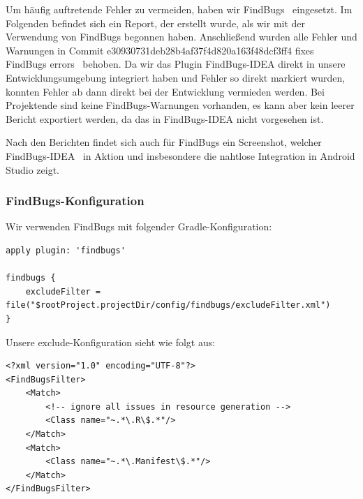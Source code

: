 
Um häufig auftretende Fehler zu vermeiden, haben wir \glqq FindBugs\grqq~ eingesetzt. Im Folgenden befindet sich ein Report, der erstellt wurde, als wir mit der Verwendung von FindBugs begonnen haben. Anschließend wurden alle Fehler und Warnungen in Commit e30930731deb28b4af37f4d820a163f48dcf3ff4 \glqq fixes FindBugs errors\grqq~ behoben. Da wir das Plugin FindBugs-IDEA direkt in unsere Entwicklungsumgebung integriert haben und Fehler so direkt markiert wurden, konnten Fehler ab dann direkt bei der Entwicklung vermieden werden. Bei Projektende sind keine FindBugs-Warnungen vorhanden, es kann aber kein leerer Bericht exportiert werden, da das in FindBugs-IDEA nicht vorgesehen ist.

Nach den Berichten findet sich auch für FindBugs ein Screenshot, welcher \glqq FindBugs-IDEA\grqq~ in Aktion und insbesondere die nahtlose Integration in Android Studio zeigt.

\subsubsection{FindBugs-Konfiguration}

Wir verwenden FindBugs mit folgender Gradle-Konfiguration:

\begin{lstlisting}
apply plugin: 'findbugs'

findbugs {
    excludeFilter = file("$rootProject.projectDir/config/findbugs/excludeFilter.xml")
}
\end{lstlisting}

Unsere exclude-Konfiguration sieht wie folgt aus:

\begin{lstlisting}
<?xml version="1.0" encoding="UTF-8"?>
<FindBugsFilter>
    <Match>
        <!-- ignore all issues in resource generation -->
        <Class name="~.*\.R\$.*"/>
    </Match>
    <Match>
        <Class name="~.*\.Manifest\$.*"/>
    </Match>
</FindBugsFilter>
\end{lstlisting}





